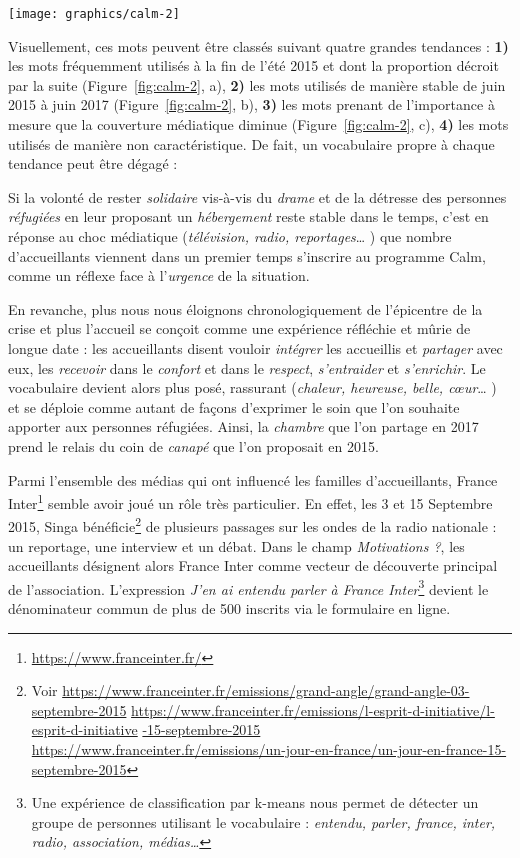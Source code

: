 \documentclass[symmetric,justified,marginals=raggedouter]{tufte-book}
\begin{document}
\begin{figure*}
  \texttt{[image: graphics/calm-2]}
  \caption{Évolution de la fréquence d'utilisation de certains termes du champ \textit{Motivations ?}}
  \label{fig:calm-2}
\end{figure*}

\noindent Visuellement, ces mots peuvent être classés suivant quatre grandes tendances : \textbf{1)} les mots fréquemment utilisés à la fin de l'été 2015 et dont la proportion décroit par la suite (Figure~\ref{fig:calm-2}, a), \textbf{2)} les mots utilisés de manière stable de juin 2015 à juin 2017 (Figure~\ref{fig:calm-2}, b), \textbf{3)} les mots prenant de l'importance à mesure que la couverture médiatique diminue (Figure~\ref{fig:calm-2}, c), \textbf{4)} les mots utilisés de manière non caractéristique. De fait, un vocabulaire propre à chaque tendance peut être dégagé :

Si la volonté de rester \textit{solidaire} vis-à-vis du \textit{drame} et de la détresse des personnes \textit{réfugiées} en leur proposant un \textit{hébergement} reste stable dans le temps, c'est en réponse au choc médiatique (\textit{télévision, radio, reportages}\ldots{} ) que nombre d'accueillants viennent dans un premier temps s'inscrire au programme Calm, comme un réflexe face à l'\textit{urgence} de la situation.

En revanche, plus nous nous éloignons chronologiquement de l'épi\-centre de la crise et plus l'accueil se conçoit comme une expérience réfléchie et mûrie de longue date : les accueillants disent vouloir \textit{intégrer} les accueillis et \textit{partager} avec eux, les \textit{recevoir} dans le \textit{confort} et dans le \textit{respect}, \textit{s'entraider} et \textit{s'enrichir}. Le vocabulaire devient alors plus posé, rassurant (\textit{chaleur, heureuse, belle, cœur}\ldots{} ) et se déploie comme autant de façons d'exprimer le soin que l'on souhaite apporter aux personnes réfugiées. Ainsi, la \textit{chambre} que l'on partage en 2017 prend le relais du coin de \textit{canapé} que l'on proposait en 2015.
   
Parmi l'ensemble des médias qui ont influencé les familles d'accueil\-lants, France Inter\footnote{\RaggedOuter \url{https://www.franceinter.fr/}} semble avoir joué un rôle très particulier. En effet, les 3 et 15 Septembre 2015, Singa bénéficie\footnote{\RaggedOuter Voir \url{https://www.franceinter.fr/emissions/grand-angle/grand-angle-03-septembre-2015} \url{https://www.franceinter.fr/emissions/l-esprit-d-initiative/l-esprit-d-initiative} \url{-15-septembre-2015} \url{https://www.franceinter.fr/emissions/un-jour-en-france/un-jour-en-france-15-septembre-2015}} de plusieurs passages sur les ondes de la radio nationale : un reportage, une interview et un débat. Dans le champ \textit{Motivations ?}, les accueillants désignent alors France Inter comme vecteur de découverte principal de l'association. L'expression \og\textit{J'en ai entendu parler à France Inter}\fg{}\footnote{\RaggedOuter Une expérience de classification par k-means nous permet de détecter un groupe de personnes utilisant le vocabulaire : \textit{entendu, parler, france, inter, radio, association, médias\ldots{}}} devient le dénominateur commun de plus de 500 inscrits via le formulaire en ligne. 
\end{document}
